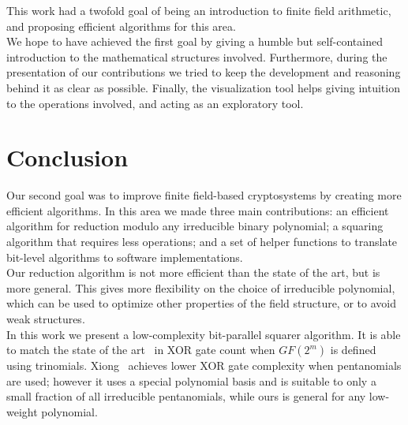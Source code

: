 


This work had a twofold goal of being an introduction to finite field arithmetic, and proposing efficient algorithms for this area. \\

We hope to have achieved the first goal by giving a humble but self-contained introduction to the mathematical structures involved. Furthermore, during the presentation of our contributions we tried to keep the development and reasoning behind it as clear as possible. Finally, the visualization tool helps giving intuition to the operations involved, and acting as an exploratory tool. \\

\section{Conclusion}

Our second goal was to improve finite field-based cryptosystems by creating more efficient algorithms. In this area we made three main contributions: an efficient algorithm for reduction modulo any irreducible binary polynomial; a squaring algorithm that requires less operations; and a set of helper functions to translate bit-level algorithms to software implementations. \\

Our reduction algorithm is not more efficient than the state of the art, but is more general. This gives more flexibility on the choice of irreducible polynomial, which can be used to optimize other properties of the field structure, or to avoid weak structures. \\

In this work we present a low-complexity bit-parallel squarer algorithm. It is able to match the state of the art~\cite{wu2002bit} in XOR gate count when $GF(2^m)$ is defined using trinomials. Xiong~\cite{xiong2014gf} achieves lower XOR gate complexity when pentanomials are used; however it uses a special polynomial basis and is suitable to only a small fraction of all irreducible pentanomials, while ours is general for any low-weight polynomial.\\

